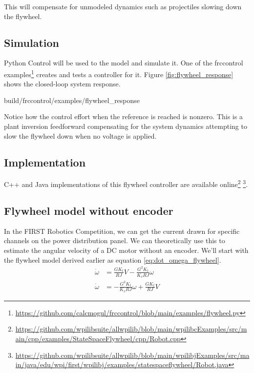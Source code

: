 This will compensate for unmodeled dynamics such as projectiles slowing down the
flywheel.

\subsection{Simulation}

Python Control will be used to  the
\gls{model} and simulate it. One of the frccontrol
examples\footnote{\url{https://github.com/calcmogul/frccontrol/blob/main/examples/flywheel.py}}
creates and tests a controller for it. Figure \ref{fig:flywheel_response} shows
the closed-loop \gls{system} response.
\begin{svg}{build/frccontrol/examples/flywheel_response}
  \caption{Flywheel response}
  \label{fig:flywheel_response}
\end{svg}

Notice how the \gls{control effort} when the \gls{reference} is reached is
nonzero. This is a plant inversion feedforward compensating for the \gls{system}
dynamics attempting to slow the flywheel down when no voltage is applied.

\subsection{Implementation}

C++ and Java implementations of this flywheel controller are available
online\footnote{\url{https://github.com/wpilibsuite/allwpilib/blob/main/wpilibcExamples/src/main/cpp/examples/StateSpaceFlywheel/cpp/Robot.cpp}}
\footnote{\url{https://github.com/wpilibsuite/allwpilib/blob/main/wpilibjExamples/src/main/java/edu/wpi/first/wpilibj/examples/statespaceflywheel/Robot.java}}.

\subsection{Flywheel model without encoder}

In the FIRST Robotics Competition, we can get the current drawn for specific
channels on the power distribution panel. We can theoretically use this to
estimate the angular velocity of a DC motor without an encoder. We'll start with
the flywheel model derived earlier as equation \eqref{eq:dot_omega_flywheel}.
\begin{align*}
  \dot{\omega} &= \frac{G K_t}{RJ} V - \frac{G^2 K_t}{K_v RJ} \omega \\
  \dot{\omega} &= -\frac{G^2 K_t}{K_v RJ} \omega + \frac{G K_t}{RJ} V
\end{align*}


